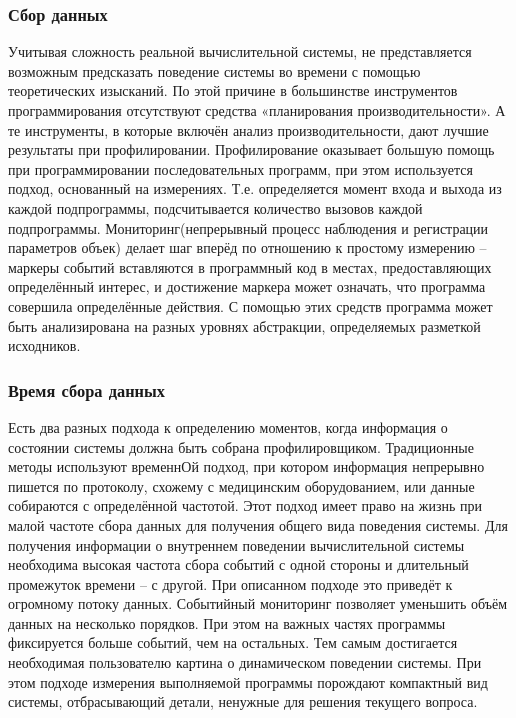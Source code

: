 \subsubsection{Сбор данных}
Учитывая сложность реальной вычислительной системы, не представляется возможным предсказать поведение системы во времени с помощью теоретических изысканий. По этой причине в большинстве инструментов программирования отсутствуют средства «планирования производительности». А те инструменты, в которые включён анализ производительности, дают лучшие результаты при профилировании. Профилирование оказывает большую помощь при программировании последовательных программ, при этом используется подход, основанный на измерениях. Т.е. определяется момент входа и выхода из каждой подпрограммы, подсчитывается количество вызовов каждой подпрограммы. Мониторинг(непрерывный процесс наблюдения и регистрации параметров объек) делает шаг вперёд по отношению к простому измерению – маркеры событий вставляются в программный код в местах, предоставляющих определённый интерес, и достижение маркера может означать, что программа совершила определённые действия. С помощью этих средств программа может быть анализирована на разных уровнях абстракции, определяемых разметкой исходников.
\subsubsection{Время сбора данных}
Есть два разных подхода к определению моментов, когда информация о состоянии системы должна быть собрана профилировщиком. Традиционные методы используют временнОй подход, при котором информация непрерывно пишется по протоколу, схожему с медицинским оборудованием, или данные собираются с определённой частотой. Этот подход имеет право на жизнь при малой частоте сбора данных для получения общего вида поведения системы. Для получения информации о внутреннем поведении вычислительной системы необходима высокая частота сбора событий с одной стороны и длительный промежуток времени – с другой. При описанном подходе это приведёт к огромному потоку данных.
Событийный мониторинг позволяет уменьшить объём данных на несколько порядков. При этом на важных частях программы фиксируется больше событий, чем на остальных. Тем самым достигается необходимая пользователю картина о динамическом поведении системы. При этом подходе измерения выполняемой программы порождают компактный вид системы, отбрасывающий детали, ненужные для решения текущего вопроса.
